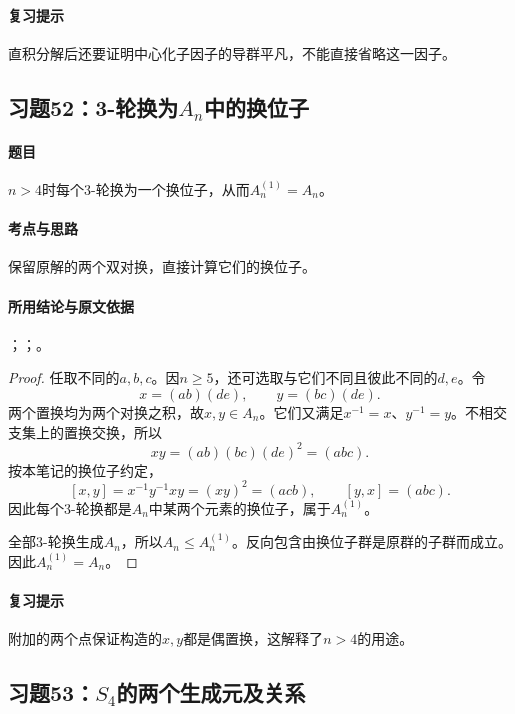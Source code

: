 \paragraph{复习提示}
直积分解后还要证明中心化子因子的导群平凡，不能直接省略这一因子。


\subsection{习题52：\texorpdfstring{3-轮换为$A_n$中的换位子}{3-轮换为An中的换位子}}
\label{ex:2:52}

\paragraph{题目}
$n>4$时每个3-轮换为一个换位子，从而$A_n^{(1)}=A_n$。

\paragraph{考点与思路}
保留原解的两个双对换，直接计算它们的换位子。

\paragraph{所用结论与原文依据}
；；。


\begin{proof}
任取不同的$a,b,c$。因$n\geq5$，还可选取与它们不同且彼此不同的$d,e$。令
\[
x=(ab)(de),\qquad y=(bc)(de).
\]
两个置换均为两个对换之积，故$x,y\in A_n$。它们又满足$x^{-1}=x$、$y^{-1}=y$。不相交支集上的置换交换，所以
\[
xy=(ab)(bc)(de)^2=(abc).
\]
按本笔记的换位子约定，
\[
[x,y]=x^{-1}y^{-1}xy=(xy)^2=(acb),\qquad
[y,x]=(abc).
\]
因此每个3-轮换都是$A_n$中某两个元素的换位子，属于$A_n^{(1)}$。

全部3-轮换生成$A_n$，所以$A_n\leq A_n^{(1)}$。反向包含由换位子群是原群的子群而成立。因此$A_n^{(1)}=A_n$。
\end{proof}

\paragraph{复习提示}
附加的两个点保证构造的$x,y$都是偶置换，这解释了$n>4$的用途。


\subsection{习题53：\texorpdfstring{$S_4$的两个生成元及关系}{S4的两个生成元及关系}}
\label{ex:2:53}


